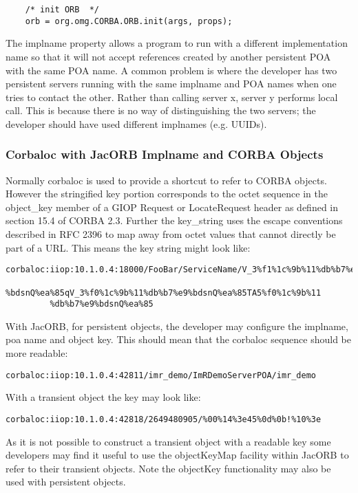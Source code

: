{{{\begin{verbatim}
    /* init ORB  */
    orb = org.omg.CORBA.ORB.init(args, props);
\end{verbatim}
}

The implname property allows a program to run with a different implementation name so that it will not accept references created by another persistent POA with the same POA name. A common problem is where the developer has two persistent servers running with the same implname and POA names when one tries to contact the other. Rather than calling server x, server y performs local call. This is because there is no way of distinguishing the two servers; the developer should have used different implnames (e.g. UUIDs).

\subsubsection{Corbaloc with JacORB Implname and CORBA Objects}

Normally corbaloc is used to provide a shortcut to refer to CORBA objects. However the stringified key portion corresponds to the octet sequence in the object\_key member of a GIOP Request or LocateRequest header as defined in section 15.4 of CORBA 2.3. Further the key\_string uses the escape conventions described in RFC 2396 to map away from octet values that cannot directly be part of a URL. This means the key string might look like:
\small{
\begin{verbatim}
corbaloc:iiop:10.1.0.4:18000/FooBar/ServiceName/V_3%f1%1c%9b%11%db%b7%e9
         %bdsnQ%ea%85qV_3%f0%1c%9b%11%db%b7%e9%bdsnQ%ea%85TA5%f0%1c%9b%11
         %db%b7%e9%bdsnQ%ea%85
\end{verbatim}
}
With JacORB, for persistent objects, the developer may configure the implname, poa name and object key. This should mean that the corbaloc sequence should be more readable:
\small{
\begin{verbatim}
corbaloc:iiop:10.1.0.4:42811/imr_demo/ImRDemoServerPOA/imr_demo
\end{verbatim}
}
With a transient object the key may look like:
\small{
\begin{verbatim}
corbaloc:iiop:10.1.0.4:42818/2649480905/%00%14%3e45%0d%0b!%10%3e
\end{verbatim}
}
As it is not possible to construct a transient object with a readable key some developers may find it useful to use the objectKeyMap facility within JacORB to refer to their transient objects. Note the objectKey functionality may also be used with persistent objects.

}}
